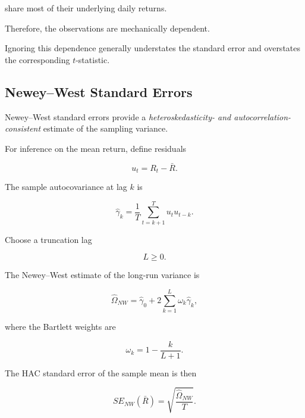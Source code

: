 \documentclass[11pt,a4paper]{article}
\begin{document}
share most of their underlying daily returns.

Therefore, the observations are mechanically dependent.

Ignoring this dependence generally understates the standard error and
overstates the corresponding $t$-statistic.


\subsection{Newey--West Standard Errors}
\label{subsec:newey_west}

Newey--West standard errors provide a
\emph{heteroskedasticity- and autocorrelation-consistent} estimate of the
sampling variance.

For inference on the mean return, define residuals

\begin{equation}
u_t
=
R_t-\bar{R}.
\end{equation}

The sample autocovariance at lag $k$ is

\begin{equation}
\boxed{
\widehat{\gamma}_k
=
\frac{1}{T}
\sum_{t=k+1}^{T}
u_tu_{t-k}.
}
\end{equation}

Choose a truncation lag

\begin{equation}
L\geq0.
\end{equation}

The Newey--West estimate of the long-run variance is

\begin{equation}
\boxed{
\widehat{\Omega}_{NW}
=
\widehat{\gamma}_0
+
2
\sum_{k=1}^{L}
\omega_k
\widehat{\gamma}_k,
}
\end{equation}

where the Bartlett weights are

\begin{equation}
\boxed{
\omega_k
=
1
-
\frac{k}{L+1}.
}
\end{equation}

The HAC standard error of the sample mean is then

\begin{equation}
\boxed{
SE_{NW}(\bar{R})
=
\sqrt{
\frac{
\widehat{\Omega}_{NW}
}{
T
}
}.
}
\end{equation}
\end{document}
